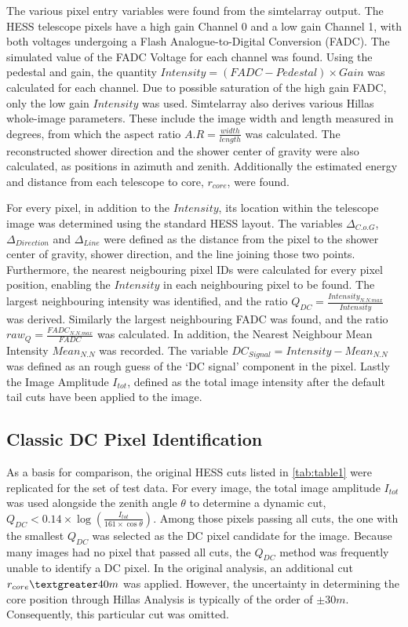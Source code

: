 \documentclass{article}
\begin{document}
The various pixel entry variables were found from the sim\textunderscore telarray output. The HESS telescope pixels have a high gain Channel 0 and a low gain Channel 1, with both voltages undergoing a Flash Analogue-to-Digital Conversion (FADC). The simulated value of the FADC Voltage for each channel was found. Using the pedestal and gain, the quantity $Intensity = (FADC - Pedestal)\times Gain $ was calculated for each channel. Due to possible saturation of the high gain FADC, only the low gain $Intensity$ was used. Sim\textunderscore telarray also derives various Hillas whole-image parameters. These include the image width and length measured in degrees, from which the aspect ratio $A.R = \frac{width}{length}$ was calculated. The reconstructed shower direction and the shower center of gravity were also calculated, as positions in azimuth and zenith. Additionally the estimated energy and distance from each telescope to core, $r_{core}$,  were found.

For every pixel, in addition to the $Intensity$, its location within the telescope image was determined using the standard HESS layout. The variables $ \Delta_{C.o.G}$, $\Delta_{Direction}$ and $\Delta_{Line}$ were defined as the distance from the pixel to the shower center of gravity, shower direction, and the line joining those two points. Furthermore, the nearest neigbouring pixel IDs were calculated for every pixel position, enabling the $Intensity$ in each neighbouring pixel to be found. The largest neighbouring intensity was identified, and the ratio $Q_{DC} = \frac{Intensity_{N.N.max}}{Intensity}$ was derived. Similarly the largest neighbouring FADC was found, and the ratio $raw_{Q} = \frac{FADC_{N.N.max}}{FADC}$ was calculated. In addition, the Nearest Neighbour Mean Intensity $Mean_{N.N}$ was recorded. The variable $DC_{Signal} = Intensity-Mean_{N.N}$ was defined as an rough guess of the \textquoteleft DC signal' component in the pixel. Lastly the Image Amplitude $I_{tot}$, defined as the total image intensity after the default tail cuts have been applied to the image.

\subsection{Classic DC Pixel Identification}
As a basis for comparison, the original HESS cuts listed in \ref{tab:table1} were replicated for the set of test data. For every image, the total image amplitude $I_{tot}$ was used alongside the zenith angle $\theta$ to determine a dynamic cut, $Q_{DC} < 0.14 \times \log(\frac{I_{tot}}{161 \times \cos \theta})$. Among those pixels passing all cuts, the one with the smallest $Q_{DC}$ was selected as the DC pixel candidate for the image. Because many images had no pixel that passed all cuts, the $Q_{DC}$ method was frequently unable to identify a DC pixel. In the original analysis, an additional cut $r_{core} \textgreater 40m$ was applied. However, the uncertainty in determining the core position through Hillas Analysis is typically of the order of $\pm 30m$. Consequently, this particular cut was omitted.
\end{document}
